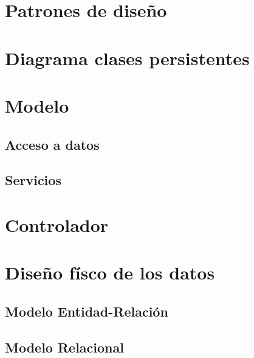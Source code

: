 \section{Patrones de diseño}

\section{Diagrama clases persistentes}
\section{Modelo}
\subsection{Acceso a datos}
\subsection{Servicios}
\section{Controlador}

\section{Diseño físco de los datos}
\subsection{Modelo Entidad-Relación}
\subsection{Modelo Relacional}






